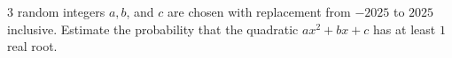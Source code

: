 $3$ random integers $a, b$, and $c$ are chosen with replacement from $-2025$ to $2025$ inclusive. Estimate the probability that the quadratic $ax^2 + bx + c$ has at least $1$ real root.
